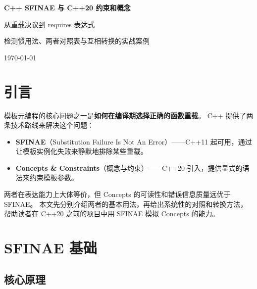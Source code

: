 \documentclass[12pt,a4paper,fontset=fandol]{ctexbook}
\begin{document}
\frontmatter

\begin{titlepage}
\centering
\vspace*{4cm}
{\Huge\bfseries C++ SFINAE 与 C++20 约束和概念\par}
\vspace{1cm}
{\LARGE 从重载决议到 requires 表达式\par}
\vspace{0.4cm}
{\Large 检测惯用法、两者对照表与互相转换的实战案例\par}
\vfill
{\large \today\par}
\end{titlepage}

\tableofcontents

\mainmatter

\cleardoublepage

\section{引言}

模板元编程的核心问题之一是\textbf{如何在编译期选择正确的函数重载}。
C++ 提供了两条技术路线来解决这个问题：

\begin{itemize}[nosep]
  \item \textbf{SFINAE}（Substitution Failure Is Not An Error）——C++11 起可用，通过让模板实例化失败来静默地排除某些重载。
  \item \textbf{Concepts \& Constraints}（概念与约束）——C++20 引入，提供显式的语法来约束模板参数。
\end{itemize}

两者在表达能力上大体等价，但 Concepts 的可读性和错误信息质量远优于 SFINAE。
本文先分别介绍两者的基本用法，再给出系统性的对照和转换方法，帮助读者在 C++20 之前的项目中用 SFINAE 模拟 Concepts 的能力。

\section{SFINAE 基础}

\subsection{核心原理}
\end{document}
